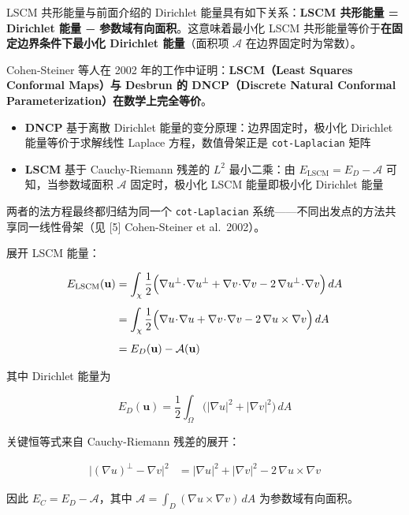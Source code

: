 \documentclass[
]{article}
\providecommand{\tightlist}{%
  \setlength{\itemsep}{0pt}\setlength{\parskip}{0pt}}
\begin{document}
LSCM 共形能量与前面介绍的 Dirichlet 能量具有如下关系：\textbf{LSCM
共形能量 = Dirichlet 能量 − 参数域有向面积}。这意味着最小化 LSCM
共形能量等价于\textbf{在固定边界条件下最小化 Dirichlet 能量}（面积项
\(\mathcal{A}\) 在边界固定时为常数）。

Cohen-Steiner 等人在 2002 年的工作中证明：\textbf{LSCM（Least Squares
Conformal Maps）与 Desbrun 的 DNCP（Discrete Natural Conformal
Parameterization）在数学上完全等价}。

\begin{itemize}
\tightlist
\item
  \textbf{DNCP} 基于离散 Dirichlet 能量的变分原理：边界固定时，极小化
  Dirichlet 能量等价于求解线性 Laplace 方程，数值骨架正是
  \texttt{cot-Laplacian} 矩阵
\item
  \textbf{LSCM} 基于 Cauchy-Riemann 残差的 \(L^2\) 最小二乘：由
  \(E_{\text{LSCM}} = E_D - \mathcal{A}\) 可知，当参数域面积
  \(\mathcal{A}\) 固定时，极小化 LSCM 能量即极小化 Dirichlet 能量
\end{itemize}

两者的法方程最终都归结为同一个 \texttt{cot-Laplacian}
系统------不同出发点的方法共享同一线性骨架（见 {[}5{]} Cohen-Steiner et
al.~2002）。

展开 LSCM 能量：

\[
\begin{aligned}
E_{\text{LSCM}}(\mathbf{u})
&= \int_{\chi} \frac{1}{2}\Bigl( \nabla u^{\perp} \!\cdot\! \nabla u^{\perp} + \nabla v \!\cdot\! \nabla v - 2\,\nabla u^{\perp} \!\cdot\! \nabla v \Bigr)\,dA \\[4pt]
&= \int_{\chi} \frac{1}{2}\Bigl( \nabla u \!\cdot\! \nabla u + \nabla v \!\cdot\! \nabla v - 2\,\nabla u \times \nabla v \Bigr)\,dA \\[4pt]
&= E_D(\mathbf{u}) - \mathcal{A}(\mathbf{u})
\end{aligned}
\]

其中 Dirichlet 能量为

\[
E_D(\mathbf{u}) = \frac{1}{2}\int_\Omega \bigl(|\nabla u|^2 + |\nabla v|^2\bigr) \, dA
\]

关键恒等式来自 Cauchy-Riemann 残差的展开：

\[
\begin{aligned}
\bigl|(\nabla u)^{\perp} - \nabla v\bigr|^2
&= |\nabla u|^2 + |\nabla v|^2 - 2\,\nabla u \times \nabla v
\end{aligned}
\]

因此 \(E_C = E_D - \mathcal{A}\)，其中
\(\mathcal{A} = \displaystyle\int_D (\nabla u \times \nabla v)\,dA\)
为参数域有向面积。
\end{document}
